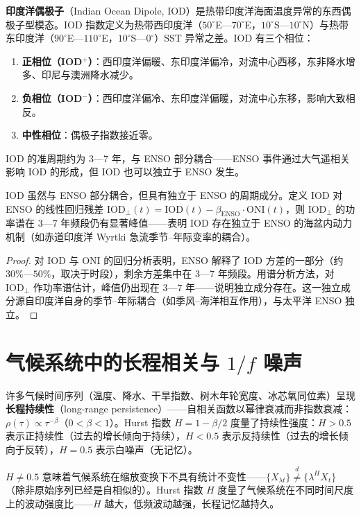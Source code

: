 \begin{definition}\label{def:iod}
\textbf{印度洋偶极子}（Indian Ocean Dipole, IOD）是热带印度洋海面温度异常的东西偶极子型模态。IOD 指数定义为热带西印度洋（$50^\circ$E—$70^\circ$E，$10^\circ$S—$10^\circ$N）与热带东印度洋（$90^\circ$E—$110^\circ$E，$10^\circ$S—$0^\circ$）SST 异常之差。IOD 有三个相位：
\begin{enumerate}[label=(\roman*)]
    \item \textbf{正相位（IOD$^+$）}：西印度洋偏暖、东印度洋偏冷，对流中心西移，东非降水增多、印尼与澳洲降水减少。
    \item \textbf{负相位（IOD$^-$）}：西印度洋偏冷、东印度洋偏暖，对流中心东移，影响大致相反。
    \item \textbf{中性相位}：偶极子指数接近零。
\end{enumerate}
IOD 的准周期约为 $3$—$7$ 年，与 ENSO 部分耦合——ENSO 事件通过大气遥相关影响 IOD 的形成，但 IOD 也可以独立于 ENSO 发生。
\end{definition}

\begin{proposition}\label{prop:iod_independence}
IOD 虽然与 ENSO 部分耦合，但具有独立于 ENSO 的周期成分。定义 IOD 对 ENSO 的线性回归残差 $\text{IOD}_{\perp}(t) = \text{IOD}(t) - \beta_{\text{ENSO}} \cdot \text{ONI}(t)$，则 $\text{IOD}_{\perp}$ 的功率谱在 $3$—$7$ 年频段仍有显著峰值——表明 IOD 存在独立于 ENSO 的海盆内动力机制（如赤道印度洋 Wyrtki 急流季节–年际变率的耦合）。
\end{proposition}

\begin{proof}
对 IOD 与 ONI 的回归分析表明，ENSO 解释了 IOD 方差的一部分（约 $30\%$—$50\%$，取决于时段），剩余方差集中在 $3$—$7$ 年频段。用谱分析方法，对 $\text{IOD}_{\perp}$ 作功率谱估计，峰值仍出现在 $3$—$7$ 年——说明独立成分存在。这一独立成分源自印度洋自身的季节–年际耦合（如季风–海洋相互作用），与太平洋 ENSO 独立。
\end{proof}

\section[气候系统中的长程相关与1/f噪声]{气候系统中的长程相关与 $1/f$ 噪声}

\begin{definition}[气候时间序列的长程持续性]\label{def:climate_long_memory}
许多气候时间序列（温度、降水、干旱指数、树木年轮宽度、冰芯氧同位素）呈现\textbf{长程持续性}（long-range persistence）——自相关函数以幂律衰减而非指数衰减：$\rho(\tau) \propto \tau^{-\beta}$（$0 < \beta < 1$）。Hurst 指数 $H = 1 - \beta/2$ 度量了持续性强度：$H > 0.5$ 表示正持续性（过去的增长倾向于持续），$H < 0.5$ 表示反持续性（过去的增长倾向于反转），$H = 0.5$ 表示白噪声（无记忆）。

$H \neq 0.5$ 意味着气候系统在缩放变换下不具有统计不变性——$\{X_{\lambda t}\} \stackrel{d}{\neq} \{\lambda^H X_t\}$（除非原始序列已经是自相似的）。Hurst 指数 $H$ 度量了气候系统在不同时间尺度上的波动强度比——$H$ 越大，低频波动越强，长程记忆越持久。
\end{definition}

